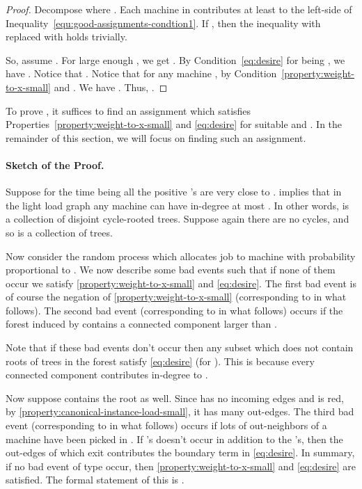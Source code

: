 \documentclass[11pt]{article}
\newcounter{prop}
\begin{document}
\begin{proof}
 Decompose  where . Each machine in  contributes at least  to the left-side of Inequality~\eqref{equ:good-assignments-condtion1}. If , then the inequality with  replaced with  holds trivially.  

  So, assume . 
 For large enough , we get . 
  By Condition~\ref{eq:desire} for  being ,  we have .  Notice that .  Notice that for any machine ,   by Condition~\ref{property:weight-to-x-small} and . We have . Thus, .
\end{proof}

To prove ,  it suffices to find an assignment  which satisfies Properties~\ref{property:weight-to-x-small} and \ref{eq:desire} for suitable  and . In the remainder of this section, we will focus on finding such an assignment.

\paragraph{Sketch of the Proof.}  Suppose for the time being all the positive 's are very close to .   implies that in the light load graph  any machine  can have in-degree at most . In other words,  is a collection of disjoint cycle-rooted trees. Suppose again there are no cycles, and so  is a collection of trees. 

Now consider the random process which allocates job  to machine  with probability proportional to .  We now describe some bad events such that if none of them occur we satisfy   \ref{property:weight-to-x-small} and \ref{eq:desire}. The first bad event is of course the negation of \ref{property:weight-to-x-small} (corresponding to  in what follows). The second  bad event (corresponding to  in what follows) occurs if the forest induced by  contains a connected component larger than . 

Note that if these bad events don't occur then any subset  which does not contain roots of trees in the forest satisfy \ref{eq:desire}   (for ). This is because every connected component contributes  in-degree to . 

Now suppose  contains the root  as well. Since  has no incoming edges and is red, by \ref{property:canonical-instance-load-small}, it has many out-edges. The third bad event (corresponding to  in what follows) occurs if lots of out-neighbors of a machine have been picked in . If 's doesn't occur in addition to the 's, then the out-edges of  which exit   contributes the boundary term in \ref{eq:desire}. In summary, if no bad event of type  occur, then \ref{property:weight-to-x-small} and \ref{eq:desire} are satisfied. The formal statement of this is .
\end{document}
